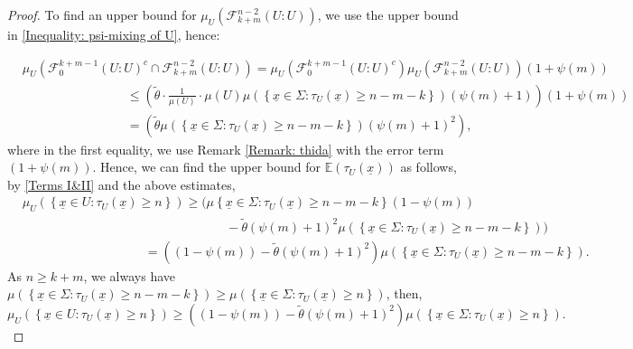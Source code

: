 \documentclass[11pt, reqno]{amsart}
\theoremstyle{plain}%
\theoremstyle{definition}
\theoremstyle{definition}
\def\F{\ensuremath{\mathcal F}}
\def\E{\mathbb E}
\def\ulx{\underline{x}}
\numberwithin{equation}{section}
\begin{document}
\begin{proof}

 
To find an upper bound for $\mu_U(\F_{k+m}^{n-2}(U:U))$, we use the upper bound in \eqref{Inequality: psi-mixing of U}, hence:

\begin{align*}
    &\mu_U\left( {\F_0^{k+m-1}(U:U)^c}\cap \F_{k+m}^{n-2}(U:U) \right)  = \mu_U\left( {\F_0^{k+m-1}(U:U)^c}\right)\mu_U\left(\F_{k+m}^{n-2}(U:U)\right)(1+\psi(m))\\&\qquad \qquad \qquad\qquad\ \le \left(\tilde{\theta}\cdot \frac{1}{\mu(U)} \cdot\mu(U) \mu \left(\left\{\ulx\in \Sigma: \tau_U(\ulx)\ge n-m-k \right\}\right)\left( \psi(m)+1\right)\right)(1+\psi(m))\\&\qquad\qquad\qquad\qquad  \ = \left(\tilde{\theta} \mu \left(\left\{\ulx\in \Sigma: \tau_U(\ulx)\ge n-m-k \right\}\right) \left( \psi(m)+1\right)^2\right),
\end{align*}
where in the first equality, we use Remark \ref{Remark: thida} with the error term $(1+\psi(m))$. Hence, we can find the upper bound for $\E(\tau_U(\ulx))$ as follows, by \eqref{Terms I&II} and the above estimates,
\begin{align*}
    &\mu_U \left( \left\{\ulx\in U: \tau_U(\ulx)\ge n \right\}\right) \ge \bigg(\mu \left\{\ulx\in \Sigma: \tau_U(\ulx)\ge n-m-k \right\}(1-\psi(m)) \\& \qquad \quad \qquad \qquad \qquad \qquad \qquad \qquad \ \ \ \ \ - \tilde{\theta}\left( \psi(m)+1\right)^2 \mu \left(\left\{\ulx\in \Sigma: \tau_U(\ulx)\ge n-m-k \right\}\right)\bigg)\\& \ \ \qquad \quad \qquad \qquad \ \ \ \ \ \ \ \ \ \ = \left((1-\psi(m))- \tilde{\theta}\left( \psi(m)+1\right)^2\right) \mu \left(\left\{\ulx\in \Sigma: \tau_U(\ulx)\ge n-m-k \right\}\right).
\end{align*}
As $n\ge k+m$, we always have $\mu \left( \left\{\ulx\in \Sigma: \tau_U(\ulx)\ge n-m-k \right\} \right)\ge  \mu \left(\left\{\ulx\in \Sigma: \tau_U(\ulx)\ge n \right\} \right)$,  then,
$$\mu_U \left(\left\{\ulx\in U: \tau_U(\ulx)\ge n \right\}\right)\ge   \left((1-\psi(m))- \tilde{\theta}\left( \psi(m)+1\right)^2\right)   \mu \left(\left\{\ulx\in \Sigma: \tau_U(\ulx)\ge n \right\} \right).$$


\end{proof}
\end{document}
